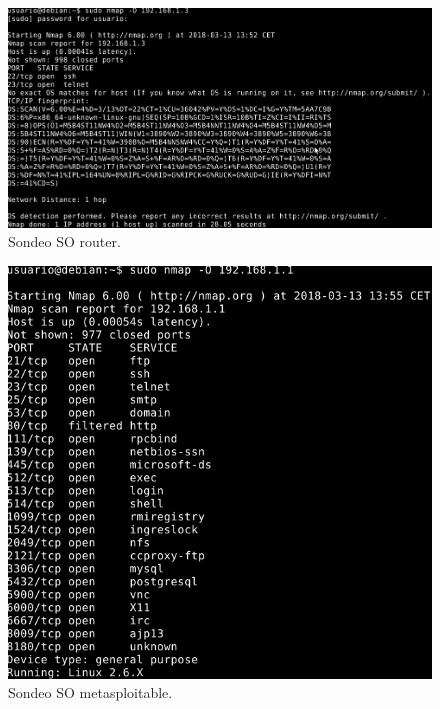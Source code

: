 \documentclass[11pt]{article}
\begin{document}
      \begin{figure}[H]
        \centering
        \includegraphics[width = \textwidth]{sondeo15}
        \caption{Sondeo SO router.}
      \end{figure}

      \begin{figure}[H]
        \centering
        \includegraphics[width = \textwidth]{sondeo16}
        \caption{Sondeo SO metasploitable.}
      \end{figure}
\end{document}
